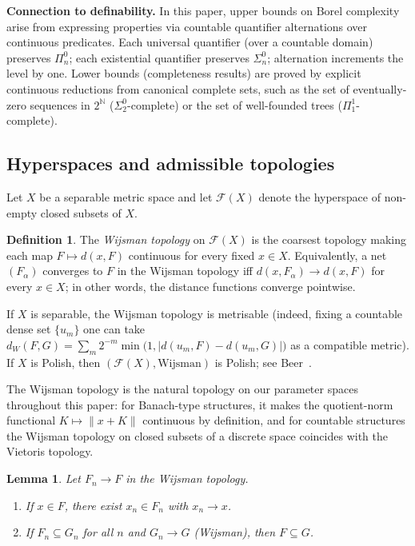 \documentclass[12pt,fleqn,a4paper]{amsart}
\numberwithin{equation}{section}
\newtheorem{lemma}[theorem]{Lemma}
\theoremstyle{definition}
\newtheorem{definition}[theorem]{Definition}
\newcommand{\N}{\mathbb{N}}
\begin{document}
\smallskip
\noindent\textbf{Connection to definability.}
In this paper, upper bounds on Borel complexity arise from
expressing properties via countable quantifier alternations over
continuous predicates.  Each universal quantifier (over a countable domain) preserves
$\Pi^0_n$; each existential quantifier preserves $\Sigma^0_n$; alternation
increments the level by one.  Lower bounds (completeness results) are proved
by explicit continuous reductions from canonical complete sets, such as the set of
eventually-zero sequences in $2^\N$ ($\Sigma^0_2$-complete) or the set of
well-founded trees ($\Pi^1_1$-complete).

\subsection{Hyperspaces and admissible topologies}\label{sec:hyperspace}

Let $X$ be a separable metric space and let $\mathscr F(X)$ denote the hyperspace of
non-empty closed subsets of $X$.

\begin{definition}\label{def:wijsman}
The \emph{Wijsman topology} on $\mathscr F(X)$ is the coarsest topology making each map
$F\mapsto d(x,F)$ continuous for every fixed $x\in X$.
Equivalently, a net $(F_\alpha)$ converges to $F$ in the Wijsman topology iff
$d(x,F_\alpha)\to d(x,F)$ for every $x\in X$; in other words, the distance functions
converge pointwise.

If $X$ is separable, the Wijsman topology is metrisable
(indeed, fixing a countable dense set $\{u_m\}$ one can take
$d_W(F,G)=\sum_m 2^{-m}\min\bigl(1,|d(u_m,F)-d(u_m,G)|\bigr)$
as a compatible metric).
If $X$ is Polish, then $(\mathscr F(X),\mathrm{Wijsman})$ is Polish;
see Beer~\cite{Beer}.
\end{definition}

The Wijsman topology is the natural topology on our parameter spaces throughout
this paper: for Banach-type structures, it makes the quotient-norm functional
$K\mapsto\|x+K\|$ continuous by definition, and for countable structures
the Wijsman topology on closed subsets of a discrete space coincides with the
Vietoris topology.

\begin{lemma}\label{lem:wijsman-approx}
Let $F_n\to F$ in the Wijsman topology.
\begin{enumerate}
\item If $x\in F$, there exist $x_n\in F_n$ with $x_n\to x$.
\item If $F_n\subseteq G_n$ for all $n$ and $G_n\to G$ (Wijsman), then $F\subseteq G$.
\end{enumerate}
\end{lemma}
\end{document}
